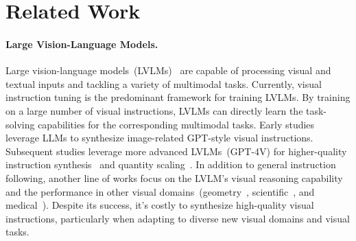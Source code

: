 \section{Related Work}
\label{sec:related-work}
\paragraph{Large Vision-Language Models.}
Large vision-language models~(LVLMs)~\cite{liu2024visual,liu2024improved} are capable of processing visual and textual inputs and tackling a variety of multimodal tasks. 
Currently, visual instruction tuning is the predominant framework for training LVLMs. 
By training on a large number of visual instructions, LVLMs can directly learn the task-solving capabilities for the corresponding multimodal tasks. Early studies~\cite{liu2024visual,zhu2023minigpt} leverage LLMs to synthesize image-related GPT-style visual instructions. Subsequent studies leverage more advanced LVLMs~(\eg GPT-4V) for higher-quality instruction synthesis~\cite{du2023makes,chen2024allava} and quantity scaling~\cite{zhao2023svit,chen2025sharegpt4v}. 
In addition to general instruction following, another line of works focus on the LVLM's visual reasoning capability~\cite{zhang2024improve,shi2024math,gao2023g} and the performance in other visual domains~(\eg geometry~\cite{shi2024math,gao2023g}, scientific~\cite{saikh2022scienceqa}, and medical~\cite{zhang2023pmc}). Despite its success, it's costly to synthesize high-quality visual instructions, particularly when adapting to diverse new visual domains and visual tasks. 




